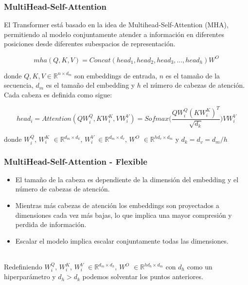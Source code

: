 \documentclass{beamer}
\newcommand\Fontvi{\fontsize{10}{12.2}\selectfont}
\newcommand\FontEq{\fontsize{8}{12.2}\selectfont}
\begin{document}
\begin{frame}
\frametitle{MultiHead-Self-Attention}

\Fontvi
El Transformer está basado en la idea de Multihead-Self-Attention (MHA), permitiendo al modelo
conjuntamente atender a información en diferentes posiciones desde diferentes subespacios de
representación.

\FontEq
\begin{equation}
    mha(Q, K, V) = Concat(head_1,head_2,head_3,..., head_h)W^O
\end{equation}

\Fontvi
donde $Q, K, V \in \mathbb{R}^{n \times d_{m}}$ son embeddings de entrada, $n$ es el tamaño de la
secuencia, $d_m$ es el tamaño del embedding y $h$ el número de cabezas de atención. Cada cabeza es
definida como sigue:

\FontEq
\begin{equation}
    head_i = Attention(QW_i^Q, KW_i^K, VW_i^V) =
    Sofmax\Big(\frac{QW_i^Q (KW_i^K)^T}{\sqrt{d_k}}\Big) VW_i^V
\end{equation}

\Fontvi
donde $W_i^Q$, $W_i^K$ $\in \mathbb{R}^{d_m \times d_k}$, $W_i^V$ $\in \mathbb{R}^{d_m \times d_v}$,
$W^O$ $\in \mathbb{R}^{hd_v \times d_m}$ y $d_k=d_v=d_m/h$

\end{frame}

\begin{frame}
\frametitle{MultiHead-Self-Attention - Flexible}

\begin{itemize}
    \item El tamaño de la cabeza es dependiente de la dimensión del embedding y el número de cabezas
          de atención.
    \item Mientras más cabezas de atención los embeddings son proyectados a dimensiones cada vez
          más bajas, lo que implica una mayor compresión y perdida de información.
    \item Escalar el modelo implica escalar conjuntamente todas las dimensiones.\\~\
\end{itemize}

Redefiniendo  $W_i^Q$, $W_i^K$, $W_i^V$ $\in \mathbb{R}^{d_m \times d_h}$,
$W^O$ $\in \mathbb{R}^{hd_h \times d_m}$ con $d_h$ como un hiperparámetro y $d_h > d_k$
podemos solventar los puntos anteriores.

\end{frame}
\end{document}
